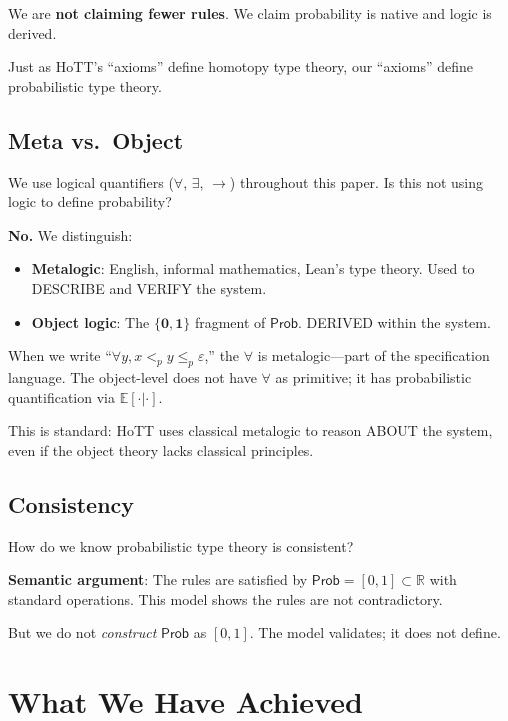 \documentclass[11pt,a4paper]{article}
\newcommand{\Prob}{\mathsf{Prob}}
\newcommand{\E}{\mathbb{E}}
\newcommand{\pzero}{\mathbf{0}}
\newcommand{\pone}{\mathbf{1}}
\newcommand{\ple}{\leq_p}
\newcommand{\plt}{<_p}
\begin{document}
We are \textbf{not claiming fewer rules}. We claim probability is native and logic is derived.

Just as HoTT's ``axioms'' define homotopy type theory, our ``axioms'' define probabilistic type theory.

\subsection{Meta vs.\ Object}

We use logical quantifiers ($\forall$, $\exists$, $\to$) throughout this paper. Is this not using logic to define probability?

\textbf{No.} We distinguish:
\begin{itemize}
    \item \textbf{Metalogic}: English, informal mathematics, Lean's type theory. Used to DESCRIBE and VERIFY the system.
    \item \textbf{Object logic}: The $\{\pzero, \pone\}$ fragment of $\Prob$. DERIVED within the system.
\end{itemize}

When we write ``$\forall y, x \plt y \ple \varepsilon$,'' the $\forall$ is metalogic---part of the specification language. The object-level does not have $\forall$ as primitive; it has probabilistic quantification via $\E[\cdot|\cdot]$.

This is standard: HoTT uses classical metalogic to reason ABOUT the system, even if the object theory lacks classical principles.

\subsection{Consistency}

How do we know probabilistic type theory is consistent?

\textbf{Semantic argument}: The rules are satisfied by $\Prob = [0,1] \subset \mathbb{R}$ with standard operations. This model shows the rules are not contradictory.

But we do not \emph{construct} $\Prob$ as $[0,1]$. The model validates; it does not define.

\section{What We Have Achieved}
\end{document}
